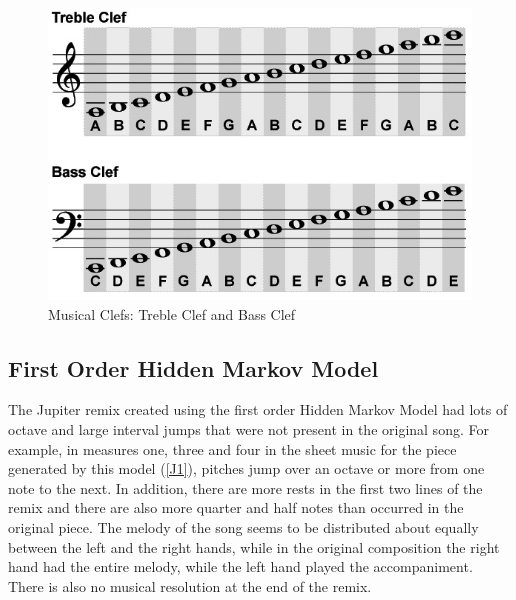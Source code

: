 \documentclass{article} %
\begin{document}
\begin{figure}[H]
\centering

\includegraphics [scale = 0.6] {clef.jpg}
\caption{Musical Clefs: Treble Clef and Bass Clef\label{keys}}
\end{figure}


\subsection{First Order Hidden Markov Model}

The Jupiter remix created using the first order Hidden Markov Model had lots of octave and large interval jumps that were not present in the original song. For example, in measures one, three and four in the sheet music for the piece generated by this model (\autoref{J1}),  pitches jump over an octave or more from one note to the next.  In addition, there are more rests in the first two lines of the remix and there are also more quarter and half notes than occurred in the original piece. The melody of the song seems to be distributed about equally between the left and the right hands, while in the original composition the right hand had the entire melody, while the left hand played the accompaniment.  There is also no musical resolution at the end of the remix.
\end{document}
